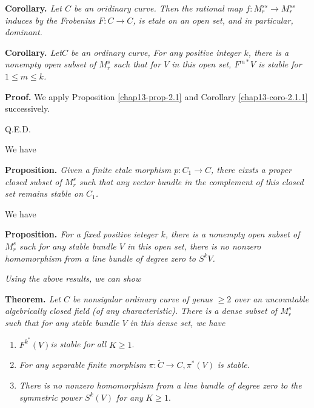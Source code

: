 \medskip
\noindent
{\bfseries {} Corollary. \label{chap13-coro-2.1.1}} \textit{Let $C$ be an oridinary curve. Then the rational map $f: M_{r}^{ss} \rightarrow M_{r}^{ss}$ induces by the Frobenius $F: C \rightarrow C$, is etale on an open set, and in particular, dominant.}


\medskip
\noindent
{\bfseries {} Corollary. \label{chap13-coro-2.1.2}} \textit{Let\pageoriginale $C$ be an ordinary curve, For any positive integer $k$, there is a nonempty open subset of $M_{r}^{s}$ such that for $V$ in this open set, $F^{m*}V$ is stable for
$1 \leq m \leq k$. }

\medskip
\noindent
{\bfseries Proof.} We apply Proposition \eqref{chap13-prop-2.1} and Corollary \eqref{chap13-coro-2.1.1} successively.

\hfill Q.E.D.

We have

\medskip
\noindent
{\bfseries {} Proposition. \label{chap13-prop-2.2}} \textit{Given a finite etale morphism $p : C_{1} \rightarrow C$, there eixsts a proper closed subset of $M_{r}^{s}$ such that any vector bundle in the complement of this closed set remains  stable on $C_{1}$.} 

We have

\medskip
\noindent
{\bfseries {} Proposition. \label{chap13-prop-2.3}} \textit{For a fixed positive ieteger $k$, there is a nonempty open subset of $M_{r}^{s}$  such for any stable bundle $V$  in this open set, there is no nonzero homomorphism from a line bundle of degree zero to $S^{k}V$.}

\textit{Using the above results, we can show
}

\medskip
\noindent
{\bfseries {} Theorem. \label{chap13-thm-2.4}} \textit{Let $C$ be nonsigular ordinary curve of genus $\geq 2$ over an uncountable algebrically closed field (of any characteristic). There is a dense subset of $M_{r}^{s}$ such that for any stable bundle $V$ in this dense set, we have}
\begin{enumerate}[\it 1)]
\item $F^{k^{*}}(V)$\textit{is stable for all} $K \geq 1$.\label{chap13-thm2.4-enum-1}

\item \textit{For any separable finite morphism} $\pi : \tilde{C} \rightarrow C, \pi^{*}(V)$ \textit{is stable}.\label{chap13-thm2.4-enum-2}

\item \textit{There is no nonzero homomorphism from a line bundle of degree zero to the symmetric power} $S^{k}(V)$
 \textit{for any} $K \geq 1$.\label{chap13-thm2.4-enum-3}
\end{enumerate}

